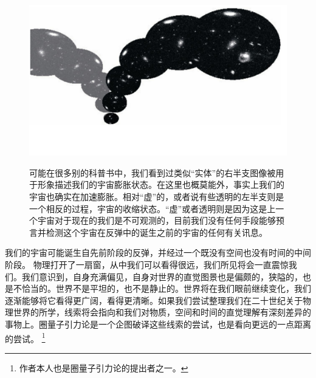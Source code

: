 \begin{figure}[htbp]
\begin{minipage}[t]{0.3\linewidth}
\centering
\bc
\includegraphics[width=3\textwidth]{img/52.png}\\[12pt]
\ec
\caption{可能在很多别的科普书中，我们看到过类似“实体”的右半支图像被用于形象描述我们的宇宙膨胀状态。在这里也概莫能外，事实上我们的宇宙也确实在加速膨胀。相对“虚”的，或者说有些透明的左半支则是一个相反的过程，宇宙的收缩状态。“虚”或者透明则是因为这是上一个宇宙对于现在的我们是不可观测的，目前我们没有任何手段能够预言并检测这个宇宙在反弹中的诞生之前的宇宙的任何有关讯息。}
\label{fig:side:a}
\end{minipage}

\end{figure} 

    我们的宇宙可能诞生自先前阶段的反弹，并经过一个既没有空间也没有时间的中间阶段。
    物理打开了一扇窗，从中我们可以看得很远，我们所见将会一直震惊我们。我们意识到，自身充满偏见，自身对世界的直觉图景也是偏颇的，狭隘的，也是不恰当的。世界不是平坦的，也不是静止的。世界将在我们眼前继续变化，我们逐渐能够将它看得更广阔，看得更清晰。如果我们尝试整理我们在二十世纪关于物理世界的所学，线索将会指向和我们对物质，空间和时间的直觉理解有深刻差异的事物上。圈量子引力论是一个企图破译这些线索的尝试，也是看向更远的一点距离的尝试。
\footnote[5]
{ 
作者本人也是圈量子引力论的提出者之一。
}


\noindent
